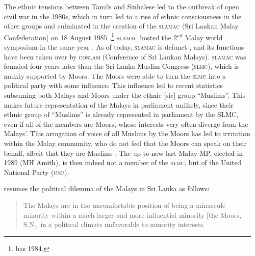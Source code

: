 The ethnic tensions between Tamils and Sinhalese led to the outbreak of open civil war in the 1980s, which in turn led to a rise of ethnic consciousness in the other groups and culminated in the creation of the \textsc{slamac} (Sri Lankan Malay Confederation) on 18 August 1985 \citep[22]{Hussainmiya1987}.\footnote{\citet[22]{Saldin2001} has 1984.} \textsc{slamac} hosted the 2$^{nd}$  Malay world symposium in the same year \citep[40]{Bichsel}. As of today, \textsc{slamac} is defunct \citep[23]{Saldin2001}, and its functions have been taken over by \textsc{coslam} (Conference of Sri Lankan Malays). \textsc{slamac} was founded four years later than the Sri Lanka Muslim Congress (\textsc{slmc}), which is mainly supported by Moors. The Moors were able to turn the \textsc{slmc} into a political party with some influence. This influence led to   recent statistics subsuming both Malays and Moors  under the ethnic [sic] group ``Muslims''. This makes future representation of the Malays in parliament unlikely, since their ethnic group of ``Muslims'' is already represented in parliament by the SLMC, even if all of the members are Moors, whose interests very often diverge from the Malays'. This arrogation of voice of all Muslims by the Moors has led to irritation within the Malay community, who do not feel that the Moors can speak on their behalf, albeit that they are Muslims \citep[24f]{Nuhman2007}. The up-to-now last Malay MP, elected in 1989 (MH Amith), is then indeed not a member of the \textsc{slmc}, but of the   United National Party (\textsc{unp}).

\citet[38]{Bichsel} resumes the political dilemma of the Malays in Sri Lanka as follows:

\begin{quote}
The Malays are in the uncomfortable position of being a minuscule minority  within a much larger and more influential minority [the Moors, S.N.] in a political climate  unfavorable to minority interests. \citep[38]{Bichsel}
\end{quote}



